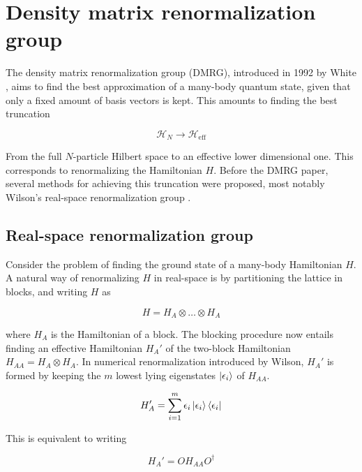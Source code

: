\section{Density matrix renormalization group}

The density matrix renormalization group (DMRG), introduced in 1992 by
White \cite{white1992density}, aims to find the best approximation of
a many-body quantum state, given that only a fixed amount of basis vectors
is kept. This amounts to finding the best truncation

\begin{equation}
  \mathcal{H}_N \rightarrow \mathcal{H}_{\text{eff}}
\end{equation}

From the full $N$-particle Hilbert space to an effective lower dimensional
one. This corresponds to renormalizing the Hamiltonian $H$. Before the
DMRG paper, several methods for achieving this truncation were proposed,
most notably Wilson's real-space renormalization group
\cite{wilson1975renormalization}.

\subsection{Real-space renormalization group}

Consider the problem of finding the ground state of a many-body
Hamiltonian $H$. A natural way of renormalizing $H$ in real-space is by
partitioning the lattice in blocks, and writing $H$ as 

\begin{equation}
  H = H_A \otimes \ldots \otimes H_A
\end{equation}

where $H_A$ is the Hamiltonian of a block.  The blocking procedure now
entails finding an effective Hamiltonian $H_{A}'$ of the two-block
Hamiltonian $H_{AA} = H_A \otimes H_A$. In numerical renormalization
introduced by Wilson, $H_{A}'$ is formed by keeping the $m$ lowest lying
eigenstates $\ket{\epsilon_{i}}$ of $H_{AA}$.

\begin{equation}
  H_{A}' = \sum_{i = 1}^{m} \epsilon_{i} \ket{\epsilon_{i}}\bra{\epsilon_{i}}
 \end{equation}

This is equivalent to writing

\begin{equation}
  H_{A}' = O H_{AA} O^{\dagger}
\end{equation}

